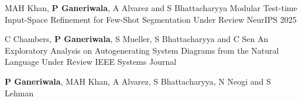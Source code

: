 


\begin{cventries}
\cventry
{MAH Khan, \textbf{P Ganeriwala}, A Alvarez and S Bhattacharyya}
{
Modular Test-time Input-Space Refinement for Few-Shot Segmentation}
{Under Review}
{NeurIPS 2025} 
{ %
\begin{cvitems}
\end{cvitems}
}
\cventry
{C Chambers, \textbf{P Ganeriwala}, S Mueller, S Bhattacharyya and C Sen}
{An Exploratory Analysis on Autogenerating System Diagrams from the Natural Language}
{Under Review}
{IEEE Systems Journal} 
{ %
\begin{cvitems}
\end{cvitems}
}
% 
\cventry
{\textbf{P Ganeriwala}, MAH Khan, A Alvarez, S Bhattacharyya, N Neogi and S Lehman}

\end{cventries}
